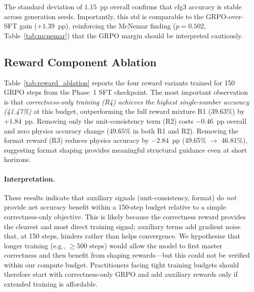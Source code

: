 \documentclass{ieeeaccess}
\begin{document}
The standard deviation of $1.15$~pp overall confirms that cfg3 accuracy
is stable across generation seeds.
Importantly, this std is comparable to the GRPO-over-SFT gain
($+1.39$~pp), reinforcing the McNemar finding ($p=0.502$, Table~\ref{tab:mcnemar})
that the GRPO margin should be interpreted cautiously.

\subsection{Reward Component Ablation}

Table~\ref{tab:reward_ablation} reports the four reward variants trained
for 150 GRPO steps from the Phase~1 SFT checkpoint.
The most important observation is that \emph{correctness-only training
(R4) achieves the highest single-number accuracy (41.47\%)} at this
budget, outperforming the full reward mixture R1 (39.63\%) by $+1.84$~pp.
Removing only the unit-consistency term (R2) costs $-0.46$~pp overall
and zero physics accuracy change ($49.65\%$ in both R1 and R2).
Removing the format reward (R3) reduces physics accuracy by $-2.84$~pp
(49.65\% $\to$ 46.81\%), suggesting format shaping provides meaningful
structural guidance even at short horizons.

\paragraph{Interpretation.}
These results indicate that auxiliary signals (unit-consistency, format)
do \emph{not} provide net accuracy benefit within a 150-step budget
relative to a simple correctness-only objective.
This is likely because the correctness reward provides the clearest and
most direct training signal; auxiliary terms add gradient noise that, at
150 steps, hinders rather than helps convergence.
We hypothesise that longer training (e.g., $\ge$500 steps) would allow
the model to first master correctness and then benefit from shaping
rewards---but this could not be verified within our compute budget.
Practitioners facing tight training budgets should therefore start with
correctness-only GRPO and add auxiliary rewards only if extended training
is affordable.
\end{document}
